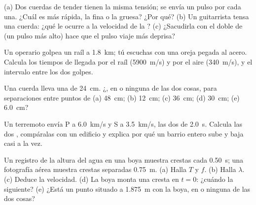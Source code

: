 \begin{exercise}[$\star\star$]\label{exo:g12:mechanical-waves:8}
(a) Dos cuerdas de tender tienen la misma tensión; se envía un pulso por
cada una. ¿Cuál es más rápida, la fina o la gruesa? ¿Por qué? (b) Un
guitarrista tensa una cuerda: ¿qué le ocurre a la velocidad de la ?
(c) ¿Sacudirla con el doble de  (un pulso más alto) hace que el
pulso viaje más deprisa?
\end{exercise}

\begin{exercise}[$\star\star$]\label{exo:g12:mechanical-waves:9}
Un operario golpea un raíl a \qty{1.8}{km}; tú escuchas con una oreja
pegada al acero. Calcula los tiempos de llegada por el raíl
(\qty{5900}{m/s}) y por el aire (\qty{340}{m/s}), y el intervalo entre
los dos golpes.
\end{exercise}

\begin{exercise}[$\star\star$]\label{exo:g12:mechanical-waves:10}
Una cuerda lleva una  de  \qty{24}{cm}.
¿, en  o ninguna de las dos cosas, para
separaciones entre puntos de (a) \qty{48}{cm}; (b) \qty{12}{cm}; (c)
\qty{36}{cm}; (d) \qty{30}{cm}; (e) \qty{6.0}{cm}?
\end{exercise}

\begin{exercise}[$\star\star$]\label{exo:g12:mechanical-waves:11}
Un terremoto envía  P a \qty{6.0}{km/s} y  S a
\qty{3.5}{km/s}, las dos de  \qty{2.0}{s}. Calcula las dos
, compáralas con un edificio y explica por qué un
barrio entero sube y baja casi a la vez.
\end{exercise}

\begin{exercise}[$\star\star\star$]\label{exo:g12:mechanical-waves:12}
Un registro de la altura del agua en una boya muestra crestas cada
\qty{0.50}{s}; una fotografía aérea muestra crestas separadas
\qty{0.75}{m}. (a) Halla $T$ y $f$. (b) Halla $\lambda$. (c) Deduce la
velocidad. (d) La boya monta una cresta en $t = 0$: ¿cuándo la
siguiente? (e) ¿Está un punto situado a \qty{1.875}{m}  con la
boya, en  o ninguna de las dos cosas?
\end{exercise}


